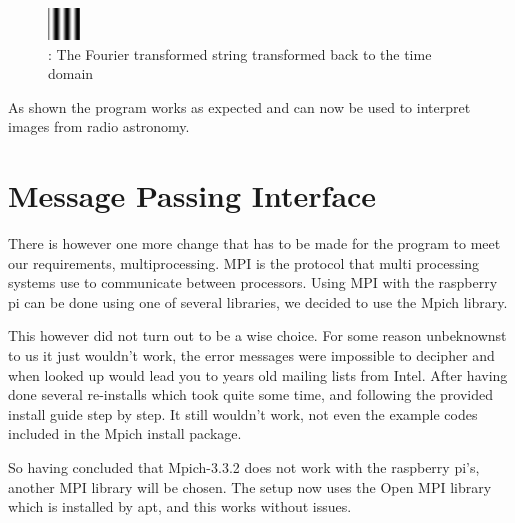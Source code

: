 \documentclass[11pt, A4, oneside]{article}
\begin{document}
\begin{figure}[!ht]
	\centering
	\includegraphics[scale=10]{processed_string_time_domain}
	\caption{: The Fourier transformed string transformed back to the time domain}
	\label{processed_string_time_domain}
\end{figure}

As shown the program works as expected and can now be used to interpret images from radio astronomy.

\section{Message Passing Interface}

There is however one more change that has to be made for the program to meet our requirements, multiprocessing. MPI is the protocol that multi processing systems use to communicate between processors. Using MPI with the raspberry pi can be done using one of several libraries, we decided to use the Mpich library. \par This however did not turn out to be a wise choice. For some reason unbeknownst to us it just wouldn't work, the error messages were impossible to decipher and when looked up would lead you to years old mailing lists from Intel. After having done several re-installs which took quite some time, and following the provided install guide step by step. It still wouldn't work, not even the example codes included in the Mpich install package. \par So having concluded that Mpich-3.3.2 does not work with the raspberry pi's, another MPI library will be chosen. The setup now uses the Open MPI library which is installed by apt, and this works without issues. 
  



\end{document}
